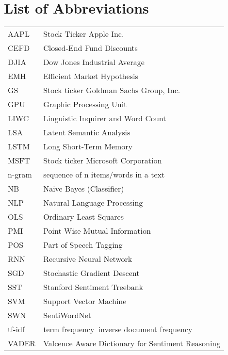 \documentclass[a4paper,12pt]{article}%
\begin{document}
\section*{List of Abbreviations}
\begin{longtable}[l]{p{60pt} p{500pt}}
AAPL & Stock Ticker Apple Inc.\\
CEFD & Closed-End Fund Discounts \\
DJIA & Dow Jones Industrial Average\\
EMH & Efficient Market Hypothesis \\
GS & Stock ticker Goldman Sachs Group, Inc. \\
GPU & Graphic Processing Unit \\
LIWC & Linguistic Inquirer and Word Count \\
LSA 	& Latent Semantic Analysis \\
LSTM & Long Short-Term Memory \\
MSFT & Stock ticker Microsoft Corporation\\
n-gram & sequence of n items/words in a text \\
NB & Naive Bayes (Classifier) \\
NLP 	& Natural Language Processing \\
OLS & Ordinary Least Squares \\
PMI 	& Point Wise Mutual Information \\
POS & Part of Speech Tagging \\
RNN 	& Recursive Neural Network	 \\
SGD	& Stochastic Gradient Descent \\
SST & Stanford Sentiment Treebank \\
SVM & Support Vector Machine \\
SWN & SentiWordNet \\
tf-idf & term frequency–inverse document frequency \\
VADER & Valcence Aware Dictionary for Sentiment Reasoning
\end{longtable}

\newpage

\setcounter{page}{1}
\end{document}
